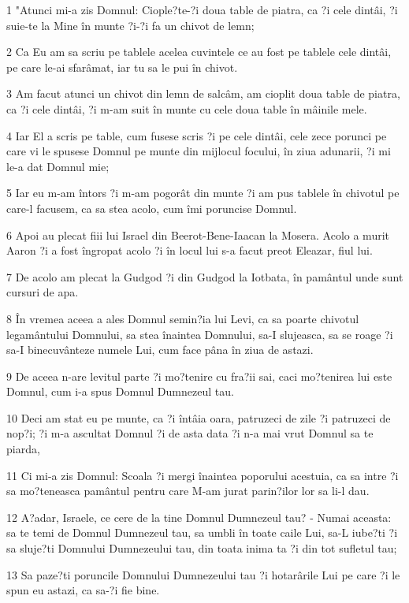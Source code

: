 \par 1 "Atunci mi-a zis Domnul: Ciople?te-?i doua table de piatra, ca ?i cele dintâi, ?i suie-te la Mine în munte ?i-?i fa un chivot de lemn;
\par 2 Ca Eu am sa scriu pe tablele acelea cuvintele ce au fost pe tablele cele dintâi, pe care le-ai sfarâmat, iar tu sa le pui în chivot.
\par 3 Am facut atunci un chivot din lemn de salcâm, am cioplit doua table de piatra, ca ?i cele dintâi, ?i m-am suit în munte cu cele doua table în mâinile mele.
\par 4 Iar El a scris pe table, cum fusese scris ?i pe cele dintâi, cele zece porunci pe care vi le spusese Domnul pe munte din mijlocul focului, în ziua adunarii, ?i mi le-a dat Domnul mie;
\par 5 Iar eu m-am întors ?i m-am pogorât din munte ?i am pus tablele în chivotul pe care-l facusem, ca sa stea acolo, cum îmi poruncise Domnul.
\par 6 Apoi au plecat fiii lui Israel din Beerot-Bene-Iaacan la Mosera. Acolo a murit Aaron ?i a fost îngropat acolo ?i în locul lui s-a facut preot Eleazar, fiul lui.
\par 7 De acolo am plecat la Gudgod ?i din Gudgod la Iotbata, în pamântul unde sunt cursuri de apa.
\par 8 În vremea aceea a ales Domnul semin?ia lui Levi, ca sa poarte chivotul legamântului Domnului, sa stea înaintea Domnului, sa-I slujeasca, sa se roage ?i sa-I binecuvânteze numele Lui, cum face pâna în ziua de astazi.
\par 9 De aceea n-are levitul parte ?i mo?tenire cu fra?ii sai, caci mo?tenirea lui este Domnul, cum i-a spus Domnul Dumnezeul tau.
\par 10 Deci am stat eu pe munte, ca ?i întâia oara, patruzeci de zile ?i patruzeci de nop?i; ?i m-a ascultat Domnul ?i de asta data ?i n-a mai vrut Domnul sa te piarda,
\par 11 Ci mi-a zis Domnul: Scoala ?i mergi înaintea poporului acestuia, ca sa intre ?i sa mo?teneasca pamântul pentru care M-am jurat parin?ilor lor sa li-l dau.
\par 12 A?adar, Israele, ce cere de la tine Domnul Dumnezeul tau? - Numai aceasta: sa te temi de Domnul Dumnezeul tau, sa umbli în toate caile Lui, sa-L iube?ti ?i sa sluje?ti Domnului Dumnezeului tau, din toata inima ta ?i din tot sufletul tau;
\par 13 Sa paze?ti poruncile Domnului Dumnezeului tau ?i hotarârile Lui pe care ?i le spun eu astazi, ca sa-?i fie bine.
